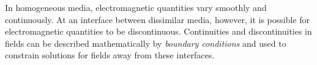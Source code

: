

\label{m0022_Boundary_Conditions_on_B} %

In homogeneous media, electromagnetic quantities vary smoothly and continuously.
At an interface between dissimilar media, however, it is possible for electromagnetic quantities to be discontinuous.
Continuities and discontinuities in fields can be described mathematically by \emph{boundary conditions} 
and used to constrain solutions for fields away from these interfaces.

